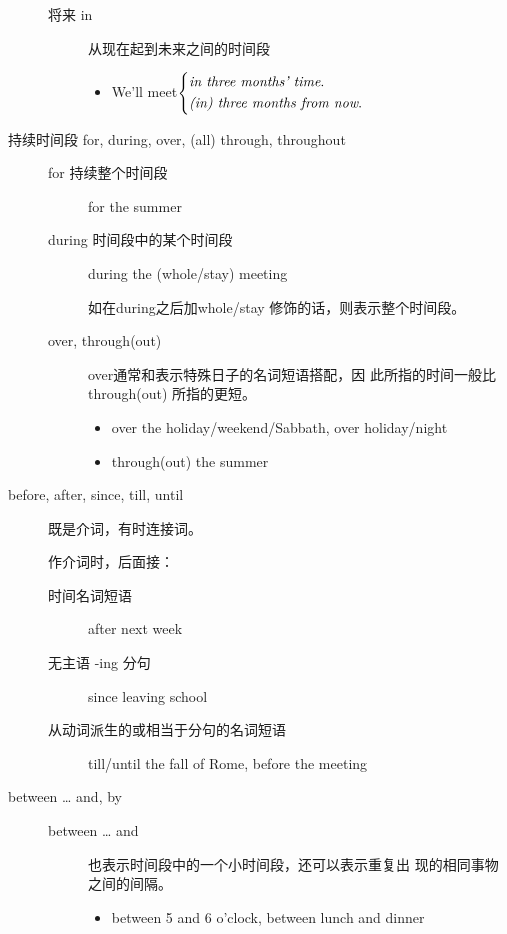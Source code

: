 \begin{description}
\begin{description}
  \item[将来 in] 从现在起到未来之间的时间段
    \begin{itemize}
    \item We'll meet$ \left\{
        \begin{aligned}
          &\text{\emph{in three months' time}.} \\
          &\text{\emph{(in) three months from now}.} \\
        \end{aligned}
      \right. $
    \end{itemize}
  \end{description}

\item[持续时间段 for, during, over, (all) through, throughout]
  \begin{description}
  \item [for 持续整个时间段] for the summer

  \item[during 时间段中的某个时间段] during the (whole/stay) meeting

    如在during之后加whole/stay 修饰的话，则表示整个时间段。


  \item[over, through(out)] over通常和表示特殊日子的名词短语搭配，因
    此所指的时间一般比 through(out) 所指的更短。
    \begin{itemize}

    \item over the holiday/weekend/Sabbath, over holiday/night

    \item through(out) the summer
    \end{itemize}

  \end{description}
\item[before, after, since, till, until] 既是介词，有时连接词。

  作介词时，后面接：
  \begin{description}
  \item[时间名词短语] after next week
  \item[无主语 -ing 分句] since leaving school
  \item[从动词派生的或相当于分句的名词短语] till/until the fall of Rome,
    before the meeting
  \end{description}

\item[between \ldots{} and, by]
  \begin{description}
  \item[between \ldots{} and] 也表示时间段中的一个小时间段，还可以表示重复出
    现的相同事物之间的间隔。
    \begin{itemize}
    \item between 5 and 6 o'clock, between lunch and dinner


\end{itemize}
\end{description}
\end{description}
